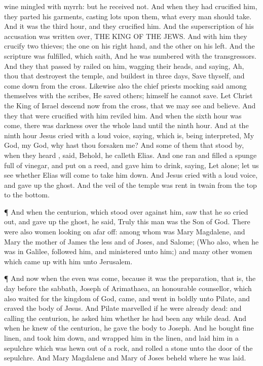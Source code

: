 {wine mingled with
myrrh:
but he
received
{}
not.
And when they had
crucified
him, they
parted
his
garments,
casting
lots
upon
them,
what every
man should
take.
And it
was the
third
hour,
and they
crucified
him.
And the
superscription of
his
accusation
was written
over, THE
KING OF THE
JEWS.
And
with
him they
crucify
two
thieves; the
one
on his right
hand,
and the
other
on
his
left.
And the
scripture was
fulfilled,
which
saith,
And he was
numbered
with the
transgressors.
And they
that passed
by railed
on
him,
wagging
their
heads,
and
saying,
Ah, thou
that
destroyest the
temple,
and
buildest
{}
in
three
days,
Save
thyself,
and come
down
from the
cross.
Likewise
also the chief
priests
mocking
said
among
themselves
with the
scribes, He
saved
others;
himself he
cannot
save.
Let
Christ the
King of
Israel
descend
now
from the
cross,
that we may
see
and
believe.
And they
that were
crucified with
him
reviled
him.
And when the
sixth
hour was
come, there
was
darkness
over the
whole
land
until the
ninth
hour.
And at the
ninth
hour
Jesus
cried with a
loud
voice,
saying,
{}
which
is, being
interpreted,
My
God,
my
God,
why hast thou
forsaken
me?
And
some of them
that stood
by, when they
heard
{},
said,
Behold, he
calleth
Elias.
And
one
ran
and
filled a
spunge
full of
vinegar,
and
put
{} on a
reed, and
gave
him to
drink,
saying, Let
alone; let us
see
whether
Elias will
come to
take
him
down.
And
Jesus
cried with a
loud
voice, and gave up the
ghost.
And the
veil of the
temple was
rent
in
twain
from the
top
to the
bottom.
\par }{\PP {}¶
And when the
centurion,
which
stood
over
against
him,
saw
that
he
so cried
out, and gave up the
ghost, he
said,
Truly
this
man
was the
Son of
God.
There
were
also
women looking
on
afar
off:
among
whom
was
Mary
Magdalene,
and
Mary the
mother of
James the
less
and of
Joses,
and
Salome;
(Who
also,
when he
was
in
Galilee,
followed
him,
and
ministered unto
him;)
and
many other
women
which came
up with
him
unto
Jerusalem.
\par }{\PP {}¶
And
now when the
even was
come,
because it
was the
preparation,
that
is, the day before the
sabbath,
Joseph
of
Arimathaea, an
honourable
counsellor,
which
also waited
for the
kingdom of
God,
came, and went
in
boldly
unto
Pilate,
and
craved the
body of
Jesus.
And
Pilate
marvelled
if he
were
already
dead:
and
calling
{} the
centurion, he
asked
him
whether he had
been any
while
dead.
And when he
knew
{}
of the
centurion, he
gave the
body to
Joseph.
And he
bought fine
linen,
and
took
him
down, and wrapped him
in the
linen,
and
laid
him
in a
sepulchre
which
was
hewn out
of a
rock,
and
rolled a
stone
unto the
door of the
sepulchre.
And
Mary
Magdalene
and
Mary
{} of
Joses
beheld
where he was
laid.

}
